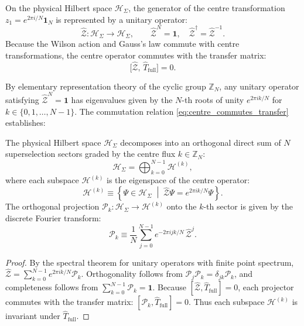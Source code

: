On the physical Hilbert space $\mathcal{H}_\Sigma$, the generator of the centre transformation $z_1 = e^{2\pi i / N} \mathbf{1}_N$ is represented by a unitary operator:
\begin{equation}
\label{eq:centre_unitary_op}
\hat{\mathcal{Z}} : \mathcal{H}_\Sigma \longrightarrow \mathcal{H}_\Sigma, \qquad \hat{\mathcal{Z}}^N = \mathbf{1}, \quad \hat{\mathcal{Z}}^\dagger = \hat{\mathcal{Z}}^{-1}.
\end{equation}
Because the Wilson action and Gauss's law commute with centre transformations, the centre operator commutes with the transfer matrix:
\begin{equation}
\label{eq:centre_commutes_transfer}
\bigl[ \hat{\mathcal{Z}}, \, \hat{T}_{\mathrm{full}} \bigr] = 0.
\end{equation}

By elementary representation theory of the cyclic group $\mathbb{Z}_N$, any unitary operator satisfying $\hat{\mathcal{Z}}^N = \mathbf{1}$ has eigenvalues given by the $N$-th roots of unity $e^{2\pi i k / N}$ for $k \in \{0, 1, \dots, N-1\}$. The commutation relation \eqref{eq:centre_commutes_transfer} establishes:

\begin{theorem}
\label{thm:centre_grading}
The physical Hilbert space $\mathcal{H}_\Sigma$ decomposes into an orthogonal direct sum of $N$ superselection sectors graded by the centre flux $k \in \mathbb{Z}_N$:
\begin{equation}
\label{eq:centre_decomposition}
\mathcal{H}_\Sigma = \bigoplus_{k=0}^{N-1} \mathcal{H}^{(k)},
\end{equation}
where each subspace $\mathcal{H}^{(k)}$ is the eigenspace of the centre operator:
\begin{equation}
\label{eq:hk_eigenspace_def}
\mathcal{H}^{(k)} \equiv \left\{ \Psi \in \mathcal{H}_\Sigma \;\middle|\; \hat{\mathcal{Z}} \Psi = e^{2\pi i k / N} \Psi \right\}.
\end{equation}
The orthogonal projection $\mathcal{P}_k : \mathcal{H}_\Sigma \to \mathcal{H}^{(k)}$ onto the $k$-th sector is given by the discrete Fourier transform:
\begin{equation}
\label{eq:centre_projector}
\mathcal{P}_k \equiv \frac{1}{N} \sum_{j=0}^{N-1} e^{-2\pi i j k / N} \, \hat{\mathcal{Z}}^j.
\end{equation}
\end{theorem}

\begin{proof}
By the spectral theorem for unitary operators with finite point spectrum, $\hat{\mathcal{Z}} = \sum_{k=0}^{N-1} e^{2\pi i k / N} \mathcal{P}_k$. Orthogonality follows from $\mathcal{P}_j \mathcal{P}_k = \delta_{jk} \mathcal{P}_k$, and completeness follows from $\sum_{k=0}^{N-1} \mathcal{P}_k = \mathbf{1}$. Because $[\hat{\mathcal{Z}}, \hat{T}_{\mathrm{full}}] = 0$, each projector commutes with the transfer matrix: $[\mathcal{P}_k, \hat{T}_{\mathrm{full}}] = 0$. Thus each subspace $\mathcal{H}^{(k)}$ is invariant under $\hat{T}_{\mathrm{full}}$.
\end{proof}

